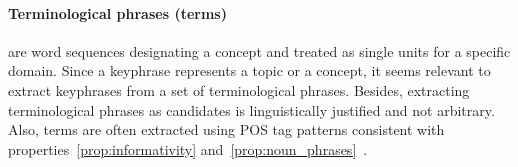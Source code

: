   \paragraph{Terminological phrases (terms)} are word sequences designating a
  concept and treated as single units for a specific domain. Since a keyphrase
  represents a topic or a concept, it seems relevant to extract
  keyphrases from  a set of terminological phrases. Besides, extracting
  terminological phrases as candidates is linguistically justified and not
  arbitrary. Also, terms are often extracted using POS tag
  patterns consistent with properties~\ref{prop:informativity}
  and~\ref{prop:noun_phrases}~\cite{castellvi2001automatictermdetection}.


